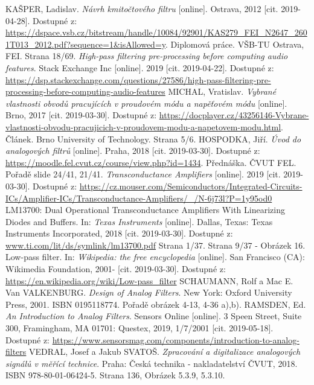 \documentclass[twoside]{article}
\begin{document}
\begin{thebibliography}{999}
KAŠPER, Ladislav. \textit{Návrh kmitočtového filtru} [online]. Ostrava, 2012 [cit. 2019-04-28]. Dostupné z: \url{https://dspace.vsb.cz/bitstream/handle/10084/92901/KAS279_FEI_N2647_2601T013_2012.pdf?sequence=1&isAllowed=y}. Diplomová práce. VŠB-TU Ostrava, FEI. Strana 18/69.
\textit{High-pass filtering pre-processing before computing audio features}. Stack Exchange Inc [online]. 2019 [cit. 2019-04-22]. Dostupné z: \url{https://dsp.stackexchange.com/questions/27586/high-pass-filtering-pre-processing-before-computing-audio-features}
MICHAL, Vratislav. \textit{Vybrané vlastnosti obvodů pracujících v proudovém módu a napěťovém módu} [online]. Brno, 2017 [cit. 2019-03-30]. Dostupné z: \url{https://docplayer.cz/43256146-Vybrane-vlastnosti-obvodu-pracujicich-v-proudovem-modu-a-napetovem-modu.html}. Článek. Brno University of Technology. Strana 5/6.
HOSPODKA, Jiří. \textit{Úvod do analogových filtrů} [online]. Praha, 2018 [cit. 2019-03-30]. Dostupné z: \url{https://moodle.fel.cvut.cz/course/view.php?id=1434}. Přednáška. ČVUT FEL. Pořadě slide 24/41, 21/41.
\textit{Transconductance Amplifiers} [online]. 2019 [cit. 2019-03-30]. Dostupné z: \url{https://cz.mouser.com/Semiconductors/Integrated-Circuits-ICs/Amplifier-ICs/Transconductance-Amplifiers/_/N-6j73l?P=1y95od0}
LM13700: Dual Operational Transconductance Amplifiers With Linearizing Diodes and Buffers. In: \textit{Texas Instruments} [online]. Dallas, Texas: Texas Instruments Incorporated, 2018 [cit. 2019-03-30]. Dostupné z: \url{www.ti.com/lit/ds/symlink/lm13700.pdf} Strana 1/37. Strana 9/37 - Obrázek 16.
Low-pass filter. In: \textit{Wikipedia: the free encyclopedia} [online]. San Francisco (CA): Wikimedia Foundation, 2001- [cit. 2019-03-30]. Dostupné z: \url{https://en.wikipedia.org/wiki/Low-pass_filter}
SCHAUMANN, Rolf a Mac E. Van VALKENBURG. \textit{Design of Analog Filters}. New York: Oxford University Press, 2001. ISBN 0195118774. Pořadě obrázek 4-13, 4-36 a),b).
RAMSDEN, Ed. \textit{An Introduction to Analog Filters}. Sensors Online [online]. 3 Speen Street, Suite 300, Framingham, MA 01701: Questex, 2019, 1/7/2001 [cit. 2019-05-18]. Dostupné z: \url{https://www.sensorsmag.com/components/introduction-to-analog-filters}
VEDRAL, Josef a Jakub SVATOŠ. \textit{Zpracování a digitalizace analogových signálů v měřící technice}. Praha: Česká technika - nakladatelství ČVUT, 2018. ISBN 978-80-01-06424-5. Strana 136, Obrázek 5.3.9, 5.3.10.
\end{thebibliography}
\end{document}
